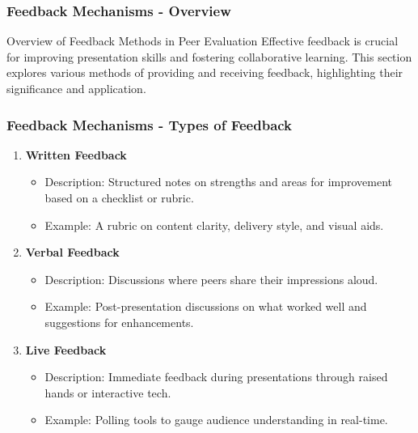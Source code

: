\documentclass[aspectratio=169]{beamer}
\begin{document}
\begin{frame}[fragile]
  \frametitle{Feedback Mechanisms - Overview}
  \begin{block}{Overview of Feedback Methods in Peer Evaluation}
    Effective feedback is crucial for improving presentation skills and fostering collaborative learning. This section explores various methods of providing and receiving feedback, highlighting their significance and application.
  \end{block}
\end{frame}

\begin{frame}[fragile]
  \frametitle{Feedback Mechanisms - Types of Feedback}
  \begin{enumerate}
    \item \textbf{Written Feedback}
      \begin{itemize}
        \item Description: Structured notes on strengths and areas for improvement based on a checklist or rubric.
        \item Example: A rubric on content clarity, delivery style, and visual aids.
      \end{itemize}
    
    \item \textbf{Verbal Feedback}
      \begin{itemize}
        \item Description: Discussions where peers share their impressions aloud.
        \item Example: Post-presentation discussions on what worked well and suggestions for enhancements.
      \end{itemize}

    \item \textbf{Live Feedback}
      \begin{itemize}
        \item Description: Immediate feedback during presentations through raised hands or interactive tech.
        \item Example: Polling tools to gauge audience understanding in real-time.
      \end{itemize}
  \end{enumerate}
\end{frame}
\end{document}
